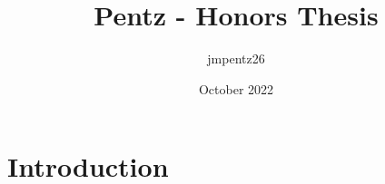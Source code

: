\documentclass{article}
\title{Pentz - Honors Thesis}
\author{jmpentz26 }
\date{October 2022}
\begin{document}
\maketitle

\section{Introduction}
\end{document}

